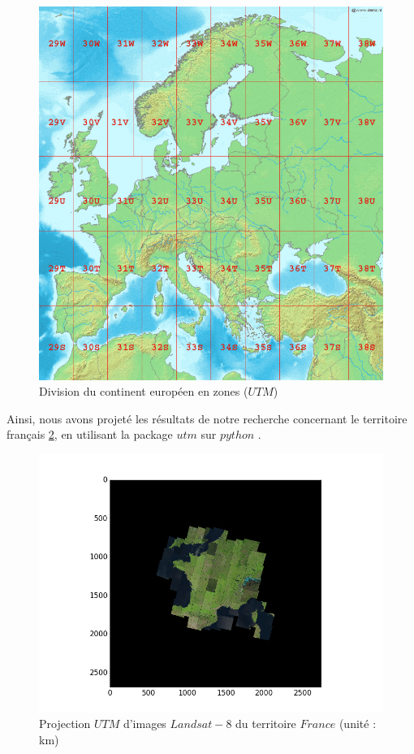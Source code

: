 \documentclass{book}
\begin{document}
\begin{figure}[H]
\begin{center}
\includegraphics[scale=0.3]{images/utm_zones_europe.png}
\end{center}
\caption{Division du continent européen en zones ($UTM$) \cite{wiki:utm}}
\label{utm_france}
\end{figure}

\clearpage

Ainsi, nous avons projeté les résultats de notre recherche concernant le territoire français \ref{projection_france}, en utilisant 
la package $utm$ sur $python$ \cite{utm_package}.

\begin{figure}[H]
\begin{center}
\includegraphics[scale=0.8]{images/projection_france.png}
\end{center}
\caption{Projection $UTM$ d'images $Landsat-8$ du territoire $France$ (unité : km)}
\label{projection_france}
\end{figure}
\end{document}
